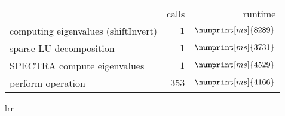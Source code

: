 \begin{tabular}{lrr}
	 & calls & runtime \\
	\hspace{0mm}computing eigenvalues (shiftInvert) & $1$ & $\numprint[ms]{8289}$ \\
	\hspace{5mm}sparse LU-decomposition & $1$ & $\numprint[ms]{3731}$ \\
	\hspace{5mm}SPECTRA compute eigenvalues & $1$ & $\numprint[ms]{4529}$ \\
	\hspace{10mm}perform operation & $353$ & $\numprint[ms]{4166}$\end{tabular}{lrr}
